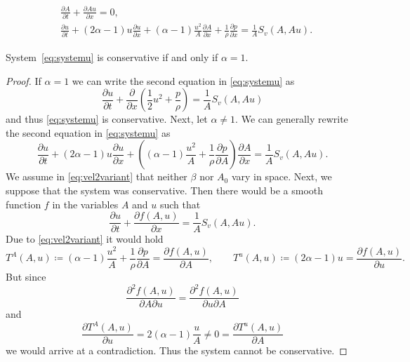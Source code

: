 \documentclass[10pt,a4paper]{amsart}
\begin{document}
\begin{equation}\label{eq:systemu}
	\begin{split}
          &\frac{\partial A}{\partial t} + \frac{\partial Au}{\partial x} = 0, \\
          & \frac{\partial u}{\partial t} + (2\alpha-1) u \frac{\partial u}{\partial x} + (\alpha-1) \frac{u^2}{A} \frac{\partial A}{\partial x} + \frac{1}{\rho} \frac{\partial p}{\partial x}  = \frac{1}{A} S_v(A, Au).
	\end{split}
\end{equation}

\begin{proposition}
  System~\eqref{eq:systemu} is conservative if and only if $\alpha=1$.
\end{proposition}

\begin{proof}
  If $\alpha=1$ we can write the second equation in \eqref{eq:systemu} as
  \begin{equation*}
    \frac{\partial u}{\partial t} + \frac{\partial}{\partial x} \left( \frac 12 u^2 +  \frac{p}{\rho} \right) =\frac{1}{A} S_v(A, Au)
  \end{equation*}
  and thus \eqref{eq:systemu} is conservative. Next, let $\alpha \ne 1$. We can generally rewrite  the second equation in \eqref{eq:systemu} as 
  \begin{equation}\label{eq:vel2variant}
    \frac{\partial u}{\partial t} + (2\alpha - 1)u \frac{\partial u}{\partial x} + \left( (\alpha -1) \frac{u^2}{A} + \frac{1}{\rho} \frac{\partial p}{\partial A} \right) \frac{\partial A}{\partial x}  =\frac{1}{A} S_v(A, Au).
  \end{equation}
  We assume in \eqref{eq:vel2variant} that neither $\beta$ nor $A_0$ vary in space. Next, we suppose that the system was conservative. Then there would be a smooth function $f$ in the variables $A$ and $u$ such that
  \begin{equation*}
    \frac{\partial u}{\partial t} + \frac{\partial f(A,u)}{\partial x} = \frac{1}{A} S_v(A, Au).
  \end{equation*}
  Due to \eqref{eq:vel2variant} it would hold
  \[
    T^A(A,u) \coloneqq (\alpha -1) \frac{u^2}{A} + \frac{1}{\rho} \frac{\partial p}{\partial A} = \frac{\partial f(A,u)}{\partial A}, \qquad T^u(A,u) \coloneqq (2\alpha - 1)u = \frac{\partial f(A,u)}{\partial u}.
  \]
      But since
      \[
        \frac{\partial^2 f(A,u)}{\partial A \partial u} =  \frac{\partial^2 f(A,u)}{\partial u \partial A}
      \]
      and
      \[
        \frac{\partial  T^A(A,u)}{\partial u} = 2 (\alpha -1) \frac{u}{A} \ne 0 = \frac{\partial T^u(A,u)}{\partial A}
      \]
      we would arrive at a contradiction. Thus the system cannot be conservative. 
    \end{proof}
\end{document}
